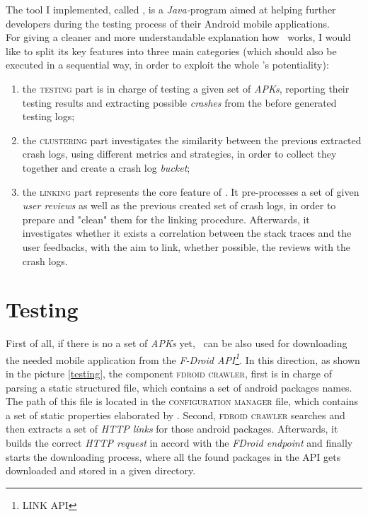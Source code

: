 The tool I implemented, called \toolname, is a \textit{Java-}program aimed at helping further developers during the testing process of their Android mobile applications. \\
For giving a cleaner and more understandable explanation how \toolname\ works, I would like to split its key features into three main categories (which should also be executed in a sequential way, in order to exploit the whole \toolname's potentiality): 
\begin{enumerate}
\item the \textsc{testing} part is in charge of testing a given set of \textit{APKs}, reporting their testing results and extracting possible \textit{crashes} from the before generated testing logs; 

\item the \textsc{clustering} part investigates the similarity between the previous extracted crash logs, using different metrics and strategies, in order to collect they together and create a crash log \textit{bucket}; 

\item the \textsc{linking} part represents the core feature of \toolname. It pre-processes a set of given \textit{user reviews} as well as the previous created set of crash logs, in order to prepare and "clean" them for the linking procedure.  Afterwards, it investigates whether it exists a correlation between the stack traces and the user feedbacks, with the aim to link, whether possible, the reviews with the crash logs. 
\end{enumerate}

\section{Testing}
First of all, if there is no a set of \textit{APKs} yet, \toolname\ can be also used for downloading the needed mobile application from the \textit{F-Droid API\footnote{LINK API}}. In this direction, as shown in the picture \ref{testing}, the component \textsc{fdroid crawler}, first is in charge of  parsing a static structured file, which contains a set of android packages names. 
The path of this file is located in the \textsc{configuration manager} file, which contains a set of static properties elaborated by \toolname. Second, \textsc{fdroid crawler} searches and then extracts a set of \textit{HTTP links} for those android packages. Afterwards, it builds the correct \textit{HTTP request} in accord with the \textit{FDroid endpoint} and finally starts the downloading process, where all the found packages in the API gets downloaded and stored in a given directory. 

